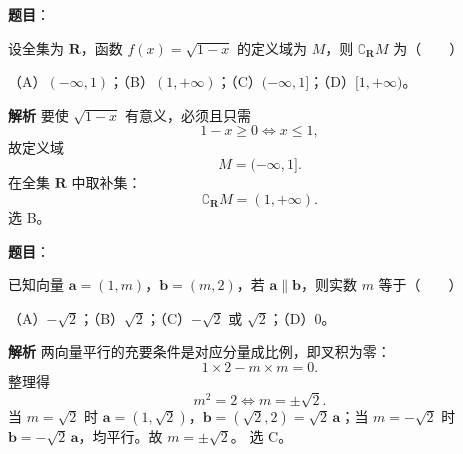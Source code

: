 

\begin{answer}

\textbf{题目}：

设全集为 $\mathbf R$，函数 $f(x)=\sqrt{1-x}$ 的定义域为 $M$，则 $\complement_{\mathbf R}M$ 为\mbox{（　　）}

（A）$(-\infty,1)$；（B）$(1,+\infty)$；（C）$(-\infty,1]$；（D）$[1,+\infty)$。

\textbf{解析}
要使 $\sqrt{1-x}$ 有意义，必须且只需
\nopagebreak[4]
\[1-x\geqslant0\Longleftrightarrow x\leqslant1,\]
故定义域
\nopagebreak[4]
\[M=(-\infty,1].\]
在全集 $\mathbf R$ 中取补集：
\nopagebreak[4]
\[\complement_{\mathbf R}M=(1,+\infty).\]
选 B。

\gkanswer{答案：B。由 $1-x\geqslant0$ 得 $M=(-\infty,1]$，故 $\complement_{\mathbf R}M=(1,+\infty)$。}

\end{answer}
\begin{answer}

\textbf{题目}：

已知向量 $\boldsymbol a=(1,m)$，$\boldsymbol b=(m,2)$，若 $\boldsymbol a\parallel\boldsymbol b$，则实数 $m$ 等于\mbox{（　　）}

（A）$-\sqrt2$；（B）$\sqrt2$；（C）$-\sqrt2$ 或 $\sqrt2$；（D）$0$。

\textbf{解析}
两向量平行的充要条件是对应分量成比例，即叉积为零：
\nopagebreak[4]
\[1\times2-m\times m=0.\]
整理得
\nopagebreak[4]
\[m^2=2\Longleftrightarrow m=\pm\sqrt2.\]
当 $m=\sqrt2$ 时 $\boldsymbol a=(1,\sqrt2)$，$\boldsymbol b=(\sqrt2,2)=\sqrt2\,\boldsymbol a$；当 $m=-\sqrt2$ 时 $\boldsymbol b=-\sqrt2\,\boldsymbol a$，均平行。故 $m=\pm\sqrt2$。
选 C。


\end{answer}
